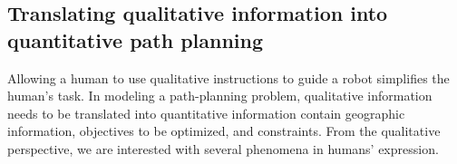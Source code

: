 \documentclass[phd]{byuprop}
\begin{document}
\subsection{Translating qualitative information into quantitative path planning}
\label{sec:intro:modeling_qualitative_information_into_quantitative_path_planning}

Allowing a human to use qualitative instructions to guide a robot simplifies the human's task.
In modeling a path-planning problem, qualitative information needs to be translated into quantitative information contain geographic information, objectives to be optimized, and constraints.
From the qualitative perspective, we are interested with several phenomena in humans' expression.
\end{document}
